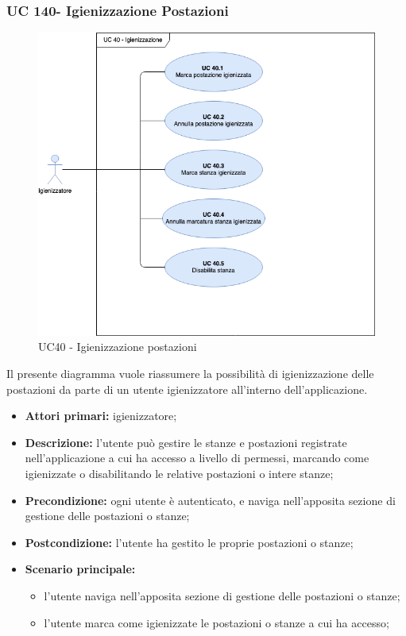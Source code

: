 \subsubsection{UC 140- Igienizzazione Postazioni}

\begin{figure}[h]
  \centering
    \includegraphics[scale=0.5]{CasiDUso//Immagini/UC40.png}
  \caption{UC40  - Igienizzazione postazioni}
\end{figure}

Il presente diagramma vuole riassumere la possibilità di igienizzazione delle postazioni da parte di un utente igienizzatore all'interno dell’applicazione.

\begin{itemize}
\item \textbf{Attori primari:} igienizzatore;
\item \textbf{Descrizione:} l’utente può gestire le stanze e postazioni registrate nell’applicazione a cui ha accesso a livello di permessi, marcando come igienizzate o disabilitando le relative postazioni o intere stanze;
\item \textbf{Precondizione:} ogni utente è autenticato, e naviga nell’apposita sezione di gestione delle postazioni o stanze;
\item \textbf{Postcondizione:} l’utente ha gestito le proprie postazioni o stanze;
\item \textbf{Scenario principale:} 
	\begin{itemize}
		\item l’utente naviga nell’apposita sezione di gestione delle postazioni o stanze;
		\item l’utente marca come igienizzate le postazioni o stanze a cui ha accesso;
	\end{itemize}
\end{itemize}

